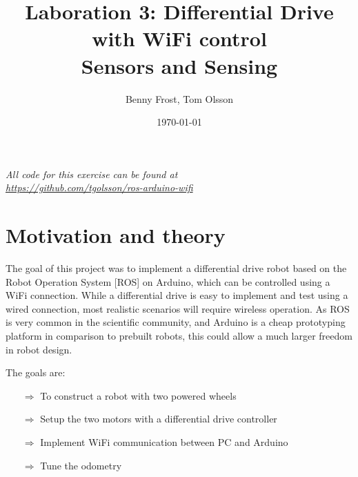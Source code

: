 \documentclass[11pt]{article}
\title{Laboration 3: Differential Drive with WiFi control\\ {\small Sensors and Sensing}} \author{Benny Frost, Tom Olsson}
\date{\today}
\begin{document}
\maketitle %
\begin{center}
  \emph{All code for this exercise can be found at \\ \url{https://github.com/tgolsson/ros-arduino-wifi}}
\end{center}
\tableofcontents
\lstlistoflistings %
\listoffigures %
\listoftables \lstset{
  matchrangestart=t} %


\section{Motivation and theory}
The goal of this project was to implement a differential drive robot based on the Robot Operation System [ROS] on Arduino, which can be controlled using a WiFi connection. While a differential drive is easy to implement and test using a wired connection, most realistic scenarios will require wireless operation. As ROS is very common in the scientific community, and Arduino is a cheap prototyping platform in comparison to prebuilt robots, this could allow a much larger freedom in robot design. \par

The goals are:
\begin{itemize}
\item[$\Rightarrow$] To construct a robot with two powered wheels
\item[$\Rightarrow$] Setup the two motors with a differential drive controller
\item[$\Rightarrow$] Implement WiFi communication between PC and Arduino 
\item[$\Rightarrow$] Tune the odometry
\end{itemize}
\end{document}
